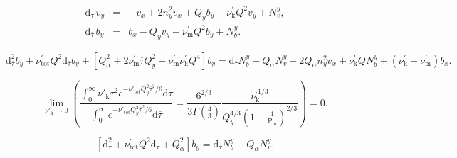 \documentclass[prb,singlecolumn]{revtex4}
\begin{document}
\begin{eqnarray}
 \mathrm{d}_{\overline{\tau}}\, v_y &=& -v_x + 2 n_y^2 v_x + Q_yb_y - \nu^\prime_\mathrm{k}Q^2v_y + N_v^y, \\
 \mathrm{d}_{\overline{\tau}}\, b_y &=& b_x  -Q_yv_y -\nu^\prime_\mathrm{m}Q^2b_y + N_b^y.
\end{eqnarray}


\begin{equation}
\label{bay_ivan}
\mathrm{d}^2_{\overline{\tau}}b_y + \nu_\mathrm{tot}^\prime Q^2\mathrm{d}_{\overline{\tau}}b_y + [Q^2_\alpha + 2\nu_\mathrm{m}^\prime \overline{\tau} Q_y^2 +\nu_\mathrm{m}^\prime\nu_\mathrm{k}^\prime Q^4]b_y
= \mathrm{d}_{\overline{\tau}}N^y_b - Q_\alpha N_v^y -2Q_\alpha n_y^2v_x + \nu_\mathrm{k}^\prime QN_b^y + (\nu_\mathrm{k}^\prime - \nu_\mathrm{m}^\prime)b_x.
\end{equation}


\begin{equation}
\lim\limits_{\nu'_\mathrm{k} \rightarrow 0}{\left(\frac{\int_0^\infty\nu'_\mathrm{k}\overline{\tau}^2e^{-\nu'_\mathrm{tot} Q_y^2\overline{\tau}^2/6}\mathrm{d}\overline{\tau}}{\int_0^\infty e^{-\nu'_\mathrm{tot} Q_y^2\overline{\tau}^2/6}\mathrm{d}\overline{\tau}} = \frac{6^{2/3}}{3\Gamma(\frac43)} \frac{\nu_\mathrm{k}^{_\prime 1/3}}{Q_y^{4/3}(1+\frac{1}{\mathrm{P}_\mathrm{m}})^{2/3} }\right)} = 0.
\end{equation}

\begin{equation}
\left[ \mathrm{d}^2_{\overline{\tau}} + \nu_\mathrm{tot}^\prime Q^2\mathrm{d}_{\overline{\tau}} + Q^2_\alpha \right]b_y =
\mathrm{d}_{\overline{\tau}}N^y_b - Q_\alpha N_v^y.
\end{equation}
\end{document}
